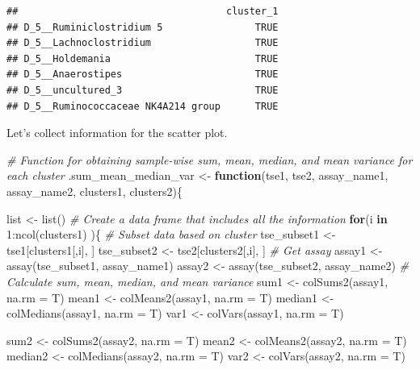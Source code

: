 \documentclass[
]{book}
\newenvironment{Shaded}{\begin{snugshade}}{\end{snugshade}}
\newcommand{\AttributeTok}[1]{\textcolor[rgb]{0.77,0.63,0.00}{#1}}
\newcommand{\CommentTok}[1]{\textcolor[rgb]{0.56,0.35,0.01}{\textit{#1}}}
\newcommand{\ControlFlowTok}[1]{\textcolor[rgb]{0.13,0.29,0.53}{\textbf{#1}}}
\newcommand{\DecValTok}[1]{\textcolor[rgb]{0.00,0.00,0.81}{#1}}
\newcommand{\FunctionTok}[1]{\textcolor[rgb]{0.00,0.00,0.00}{#1}}
\newcommand{\NormalTok}[1]{#1}
\newcommand{\OtherTok}[1]{\textcolor[rgb]{0.56,0.35,0.01}{#1}}
\newcommand{\SpecialCharTok}[1]{\textcolor[rgb]{0.00,0.00,0.00}{#1}}
\begin{document}
\begin{verbatim}
##                                    cluster_1
## D_5__Ruminiclostridium 5                TRUE
## D_5__Lachnoclostridium                  TRUE
## D_5__Holdemania                         TRUE
## D_5__Anaerostipes                       TRUE
## D_5__uncultured_3                       TRUE
## D_5__Ruminococcaceae NK4A214 group      TRUE
\end{verbatim}

Let's collect information for the scatter plot.

\begin{Shaded}
\begin{Highlighting}[]
\CommentTok{\# Function for obtaining sample{-}wise sum, mean, median, and mean variance for each cluster}
\NormalTok{.sum\_mean\_median\_var }\OtherTok{\textless{}{-}} \ControlFlowTok{function}\NormalTok{(tse1, tse2, assay\_name1, assay\_name2, clusters1, clusters2)\{}
  
\NormalTok{  list }\OtherTok{\textless{}{-}} \FunctionTok{list}\NormalTok{()}
  \CommentTok{\# Create a data frame that includes all the information}
  \ControlFlowTok{for}\NormalTok{(i }\ControlFlowTok{in} \DecValTok{1}\SpecialCharTok{:}\FunctionTok{ncol}\NormalTok{(clusters1) )\{}
    \CommentTok{\# Subset data based on cluster}
\NormalTok{    tse\_subset1 }\OtherTok{\textless{}{-}}\NormalTok{ tse1[clusters1[,i], ]}
\NormalTok{    tse\_subset2 }\OtherTok{\textless{}{-}}\NormalTok{ tse2[clusters2[,i], ]}
    \CommentTok{\# Get assay}
\NormalTok{    assay1 }\OtherTok{\textless{}{-}} \FunctionTok{assay}\NormalTok{(tse\_subset1, assay\_name1)}
\NormalTok{    assay2 }\OtherTok{\textless{}{-}} \FunctionTok{assay}\NormalTok{(tse\_subset2, assay\_name2)}
    \CommentTok{\# Calculate sum, mean, median, and mean variance}
\NormalTok{    sum1 }\OtherTok{\textless{}{-}} \FunctionTok{colSums2}\NormalTok{(assay1, }\AttributeTok{na.rm =}\NormalTok{ T)}
\NormalTok{    mean1 }\OtherTok{\textless{}{-}} \FunctionTok{colMeans2}\NormalTok{(assay1, }\AttributeTok{na.rm =}\NormalTok{ T)}
\NormalTok{    median1 }\OtherTok{\textless{}{-}} \FunctionTok{colMedians}\NormalTok{(assay1, }\AttributeTok{na.rm =}\NormalTok{ T)}
\NormalTok{    var1 }\OtherTok{\textless{}{-}} \FunctionTok{colVars}\NormalTok{(assay1, }\AttributeTok{na.rm =}\NormalTok{ T)}
    
\NormalTok{    sum2 }\OtherTok{\textless{}{-}} \FunctionTok{colSums2}\NormalTok{(assay2, }\AttributeTok{na.rm =}\NormalTok{ T)}
\NormalTok{    mean2 }\OtherTok{\textless{}{-}} \FunctionTok{colMeans2}\NormalTok{(assay2, }\AttributeTok{na.rm =}\NormalTok{ T)}
\NormalTok{    median2 }\OtherTok{\textless{}{-}} \FunctionTok{colMedians}\NormalTok{(assay2, }\AttributeTok{na.rm =}\NormalTok{ T)}
\NormalTok{    var2 }\OtherTok{\textless{}{-}} \FunctionTok{colVars}\NormalTok{(assay2, }\AttributeTok{na.rm =}\NormalTok{ T)}
    

\end{Highlighting}
\end{Shaded}
\end{document}
